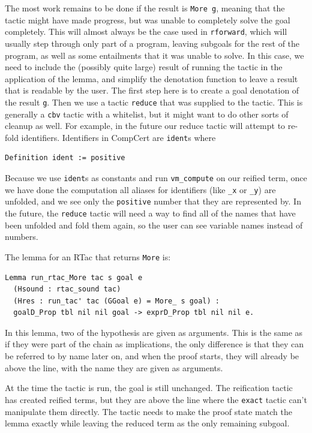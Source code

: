 \documentclass{puthesis}
\begin{document}
The most work remains to be done if the result is \lstinline|More g|,
meaning that the tactic might have made progress, but was unable to
completely solve the goal completely. This will almost always be the
case used in \lstinline|rforward|, which will usually step through
only part of a program, leaving subgoals for the rest of the program,
as well as some entailments that it was unable to solve.  In this
case, we need to include the (possibly quite large) result of running
the tactic in the application of the lemma, and simplify the
denotation function to leave a result that is readable by the user.
The first step here is to create a goal denotation of the result
\lstinline|g|. Then we use a tactic \lstinline|reduce| that was
supplied to the tactic. This is generally a \lstinline|cbv| tactic
with a whitelist, but it might want to do other sorts of cleanup as
well. For example, in the future our reduce tactic will attempt to
re-fold identifiers. Identifiers in CompCert are \lstinline|ident|s
where

\begin{lstlisting}
Definition ident := positive
\end{lstlisting}

Because we use \lstinline|ident|s as constants and run
\lstinline|vm_compute| on our reified term, once we have done the
computation all aliases for identifiers (like \lstinline|_x| or
\lstinline|_y|) are unfolded, and we see only the \lstinline|positive|
number that they are represented by. In the future, the
\lstinline|reduce| tactic will need a way to find all of the names
that have been unfolded and fold them again, so the user can see
variable names instead of numbers. 

The lemma for an RTac that returns \lstinline|More| is:

\begin{lstlisting}
Lemma run_rtac_More tac s goal e
  (Hsound : rtac_sound tac) 
  (Hres : run_tac' tac (GGoal e) = More_ s goal) :
  goalD_Prop tbl nil nil goal -> exprD_Prop tbl nil nil e.
\end{lstlisting}

In this lemma, two of the hypothesis are given as arguments. This is
the same as if they were part of the chain as implications, the only
difference is that they can be referred to by name later on, and when
the proof starts, they will already be above the line, with the name
they are given as arguments.

At the time the tactic is run, the goal is still unchanged. The
reification tactic has created reified terms, but they are above the
line where the \lstinline|exact| tactic can't manipulate them
directly. The tactic needs to make the proof state match the lemma
exactly while leaving the reduced term as the only remaining
subgoal.
\end{document}
